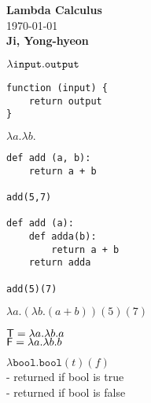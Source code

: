 \documentclass[11pt,openany]{article}
\begin{document}
\begin{center}
	\huge\textbf{Lambda Calculus}\\
	\vspace{0.5em}
	\normalsize{\today}\\
	\vspace{0.5em}
	\large\textbf{Ji, Yong-hyeon}\\
	\vspace{0.5em}
\end{center}

$\lambda\texttt{input}.\texttt{output}$
\begin{lstlisting}
function (input) {
	return output
}
\end{lstlisting}

$\lambda a.\lambda b.$
\begin{lstlisting}
def add (a, b):
	return a + b
	
add(5,7)

def add (a):
	def adda(b):
		return a + b
	return adda

add(5)(7)
\end{lstlisting}
$\lambda a. (\lambda b.(a+b))(5)(7)$

$\mathsf{T}=\lambda a.\lambda b. a$\\
$\textsf{F}=\lambda a.\lambda b. b$

$\lambda\texttt{bool}.\texttt{bool}(t)(f)$\\
- returned if bool is true\\
- returned if bool is false
\end{document}
